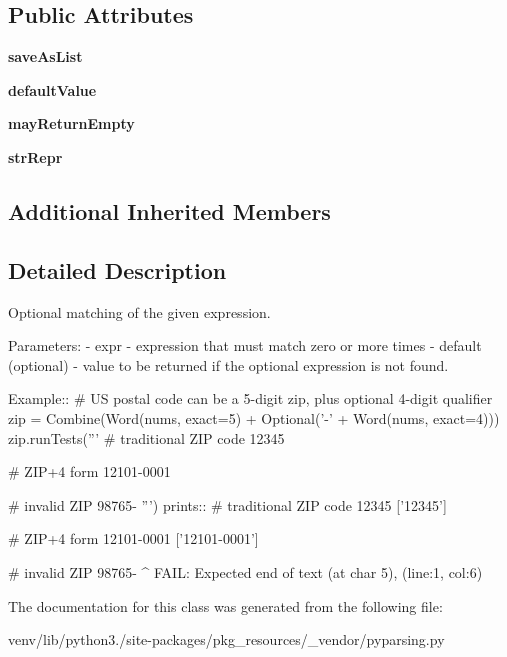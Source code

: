 \subsection*{Public Attributes}
\begin{DoxyCompactItemize}
\item 
\mbox{\label{classpkg__resources_1_1__vendor_1_1pyparsing_1_1_optional_a5ad6e109513ef4cb30bc943fefb0aea7}} 
{\bfseries save\+As\+List}
\item 
\mbox{\label{classpkg__resources_1_1__vendor_1_1pyparsing_1_1_optional_a11404c083f62200af585f06f475038e3}} 
{\bfseries default\+Value}
\item 
\mbox{\label{classpkg__resources_1_1__vendor_1_1pyparsing_1_1_optional_a552045a3dc2e454a60c533ad305ad7c5}} 
{\bfseries may\+Return\+Empty}
\item 
\mbox{\label{classpkg__resources_1_1__vendor_1_1pyparsing_1_1_optional_af1f15a2115ea411762e3acc46c32123b}} 
{\bfseries str\+Repr}
\end{DoxyCompactItemize}
\subsection*{Additional Inherited Members}


\subsection{Detailed Description}
\begin{DoxyVerb}Optional matching of the given expression.

Parameters:
 - expr - expression that must match zero or more times
 - default (optional) - value to be returned if the optional expression is not found.

Example::
    # US postal code can be a 5-digit zip, plus optional 4-digit qualifier
    zip = Combine(Word(nums, exact=5) + Optional('-' + Word(nums, exact=4)))
    zip.runTests('''
        # traditional ZIP code
        12345
        
        # ZIP+4 form
        12101-0001
        
        # invalid ZIP
        98765-
        ''')
prints::
    # traditional ZIP code
    12345
    ['12345']

    # ZIP+4 form
    12101-0001
    ['12101-0001']

    # invalid ZIP
    98765-
         ^
    FAIL: Expected end of text (at char 5), (line:1, col:6)
\end{DoxyVerb}
 

The documentation for this class was generated from the following file\+:\begin{DoxyCompactItemize}
\item 
venv/lib/python3./site-\/packages/pkg\+\_\+resources/\+\_\+vendor/pyparsing.\+py\end{DoxyCompactItemize}
